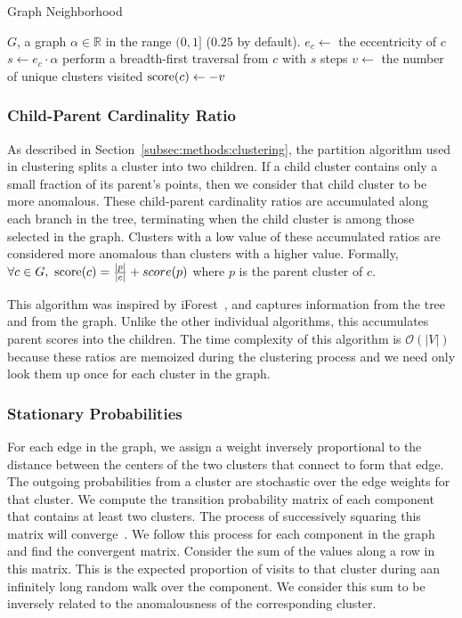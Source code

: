 \begin{algorithm}[h]
    \caption{Graph Neighborhood}
    \label{alg:graph-neighborhood-size}
\begin{algorithmic}[1]
    \REQUIRE $G$, a graph
    \REQUIRE $\alpha \in \mathbb{R}$ in the range $(0,1]$ ($0.25$ by default).
        \STATE $e_c \gets$ the eccentricity of $c$
        \STATE $s \gets e_c \cdot \alpha$  %
        \STATE perform a breadth-first traversal from $c$ with $s$ steps
        \STATE $v \gets$ the number of unique clusters visited
        \STATE $\operatorname{score}(c) \gets -v$
    \ENDFOR
\end{algorithmic}
\end{algorithm}


\subsubsection{Child-Parent Cardinality Ratio}
\label{subsubsec:methods:individual-algorithms:child-parent-cardinality-ratio}
As described in Section~\ref{subsec:methods:clustering}, the partition algorithm used in clustering splits a cluster into two children.
If a child cluster contains only a small fraction of its parent's points, then we consider that child cluster to be more anomalous.
These child-parent cardinality ratios are accumulated along each branch in the tree, terminating when the child cluster is among those selected in the graph.
Clusters with a low value of these accumulated ratios are considered more anomalous than clusters with a higher value.
Formally, $\forall c \in G, \ \score(c) = \frac{|p|}{|c|} + score(p)$ where $p$ is the parent cluster of $c$.

This algorithm was inspired by iForest~\cite{tony2008iforest}, and captures information from the tree and from the graph.
Unlike the other individual algorithms, this accumulates parent scores into the children.
The time complexity of this algorithm is $\mathcal{O}(|V|)$ because these ratios are memoized during the clustering process and we need only look them up once for each cluster in the graph.


\subsubsection{Stationary Probabilities}
\label{subsubsec:methods:individual-algorithms:stationary-probabilities}
For each edge in the graph, we assign a weight inversely proportional to the distance between the centers of the two clusters that connect to form that edge.
The outgoing probabilities from a cluster are stochastic over the edge weights for that cluster.
We compute the transition probability matrix of each component that contains at least two clusters.
The process of successively squaring this matrix will converge~\cite{levin2017markov}.
We follow this process for each component in the graph and find the convergent matrix.
Consider the sum of the values along a row in this matrix.
This is the expected proportion of visits to that cluster during aan infinitely long random walk over the component.
We consider this sum to be inversely related to the anomalousness of the corresponding cluster.

